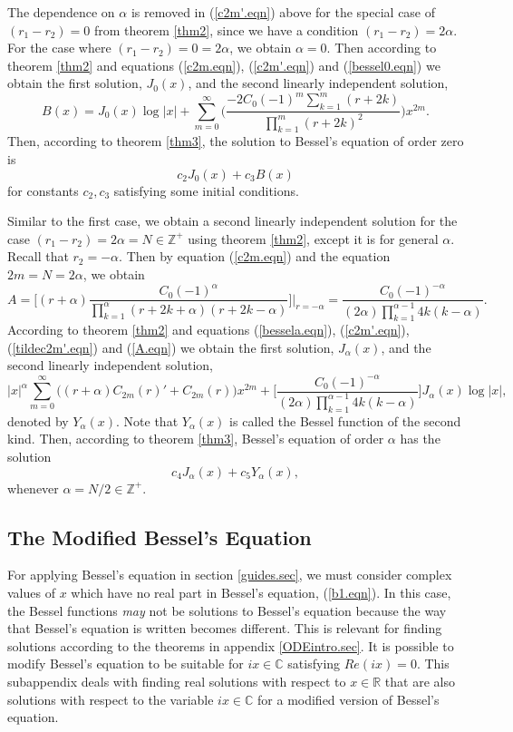 \documentclass[12pt]{article}
\theoremstyle{definition}
\numberwithin{equation}{section}
\begin{document}
{The dependence on $\alpha$ is removed in (\ref{c2m'.eqn}) above for the special case of $(r_1-r_2)=0$ from theorem \ref{thm2}, since we have a condition $(r_1-r_2)=2\alpha$. For the case where $(r_1-r_2)=0=2\alpha$, we obtain $\alpha=0$. Then according to theorem \ref{thm2} and equations (\ref{c2m.eqn}), (\ref{c2m'.eqn}) and (\ref{bessel0.eqn}) we obtain the first solution, $J_0(x)$, and the second linearly independent solution,
$$B(x)=J_0(x)\log{|x|}+\sum_{m=0}^\infty\Bigg(\frac{-2C_0(-1)^m\sum_{k=1}^m(r+2k)}{\prod_{k=1}^m(r+2k)^2}\Bigg)x^{2m}.$$
Then, according to theorem \ref{thm3}, the solution to Bessel's equation of order zero is
\begin{equation}
c_2J_0(x)+c_3B(x)
\label{fullbessel0.eqn}
\end{equation}
for constants $c_2,c_3$ satisfying some initial conditions.

Similar to the first case, we obtain a second linearly independent solution for the case $(r_1-r_2)=2\alpha=N\in\mathbb{Z}^{+}$ using theorem \ref{thm2}, except it is for general $\alpha$. Recall that $r_2=-\alpha$. Then by equation (\ref{c2m.eqn}) and the equation $2m=N=2\alpha$, we obtain
\begin{equation}
A=\bigg[(r+\alpha)\frac{C_0(-1)^\alpha}{\prod_{k=1}^\alpha(r+2k+\alpha)(r+2k-\alpha)}\bigg]\bigg|_{r=-\alpha}=\frac{C_0(-1)^{-\alpha}}{(2\alpha)\prod_{k=1}^{\alpha-1}4k(k-\alpha)}.
\label{A.eqn}
\end{equation}
According to theorem \ref{thm2} and equations (\ref{bessela.eqn}), (\ref{c2m'.eqn}), (\ref{tildec2m'.eqn}) and (\ref{A.eqn}) we obtain the first solution, $J_\alpha(x)$, and the second linearly independent solution,
$$|x|^\alpha\sum_{m=0}^\infty\Big((r+\alpha)C_{2m}(r)'+C_{2m}(r)\Big)x^{2m}+\bigg[\frac{C_0(-1)^{-\alpha}}{(2\alpha)\prod_{k=1}^{\alpha-1}4k(k-\alpha)}\bigg]J_\alpha(x)\log{|x|},$$
denoted by $Y_\alpha(x)$. Note that $Y_\alpha(x)$ is called the Bessel function of the second kind. Then, according to theorem \ref{thm3}, Bessel's equation of order $\alpha$ has the solution
\begin{equation}
c_4J_\alpha(x)+c_5Y_\alpha(x),
\label{fullbesselN.eqn}
\end{equation}
whenever $\alpha=N\slash 2\in\mathbb{Z}^{+}$.
\subsection{The Modified Bessel's Equation}\label{modified_bessel.sec}
For applying Bessel's equation in section \ref{guides.sec}, we must consider complex values of $x$ which have no real part in Bessel's equation, (\ref{b1.eqn}). In this case, the Bessel functions \textit{may} not be solutions to Bessel's equation because the way that Bessel's equation is written becomes different. This is relevant for finding solutions according to the theorems in appendix \ref{ODEintro.sec}. It is possible to modify Bessel's equation to be suitable for $ix\in\mathbb{C}$ satisfying $Re(ix)=0$. This subappendix deals with finding real solutions with respect to $x\in\mathbb{R}$ that are also solutions with respect to the variable $ix\in\mathbb{C}$ for a modified version of Bessel's equation.

}
\end{document}
